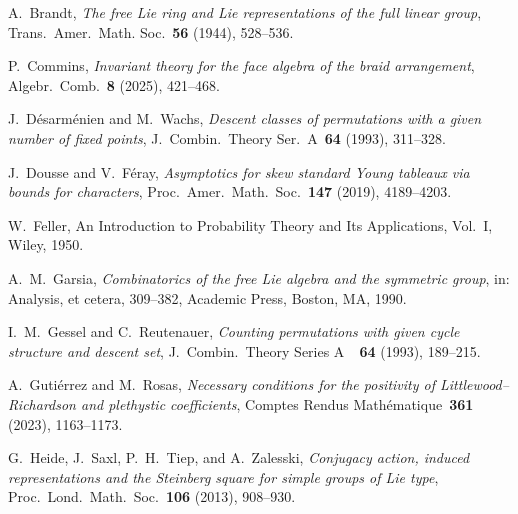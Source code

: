 \documentclass[12pt]%
{amsart}
\def\red#1{{\color{red}{#1}}}
\def\magenta#1{{\color{magenta}{#1}}}
\theoremstyle{plain}
\theoremstyle{definition}
\theoremstyle{remark}
\begin{document}
\begin{thebibliography}{}
    A.\ Brandt, 
    {\em The free Lie ring and Lie representations of the full linear group}, 
    Trans.\ Amer.\ Math. Soc.~{\bf 56} (1944), 528--536.


    P.\ Commins, 
    {\em Invariant theory for the face algebra of the braid arrangement}, 
    Algebr.\ Comb.~{\bf 8} (2025), 421--468.

    J.\ D\'esarm\'enien and M.\ Wachs, 
    {\em Descent classes of permutations with a given number of fixed points}, 
    J.\ Combin.\ Theory Ser.\ A~{\bf 64} (1993), 311--328.

    J.\ Dousse and V.\ F\'eray,
    {\em Asymptotics for skew standard Young tableaux via bounds for characters},
    Proc.\ Amer.\ Math.\ Soc.~{\bf 147} (2019), 4189--4203.

    W.\ Feller,
    An Introduction to Probability Theory and Its Applications, Vol.\ I,
    Wiley, 1950.



    A.\ M.\	Garsia, 
    {\em Combinatorics of the free Lie algebra and the symmetric group}, 
    in: Analysis, et cetera, 309--382, Academic Press, Boston, MA, 1990.

    I.\ M.\ Gessel and C.\ Reutenauer, 
    {\em Counting permutations with	given cycle structure and descent set}, 
    J.\ Combin.\ Theory Series A~{\bf~64} (1993), 189--215.

    A.\ Guti\'errez and M.\ Rosas,
    {\em Necessary conditions for the positivity of Littlewood–Richardson and plethystic coefficients},
    Comptes Rendus Math\'ematique~{\bf 361} (2023), 1163--1173.

    G.\ Heide, J.\ Saxl, P.\ H.\ Tiep, and A.\ Zalesski, 
    {\em Conjugacy action, induced representations and the Steinberg square for simple groups of Lie type}, 
    Proc.\ Lond.\ Math.\ Soc.~{\bf  106} (2013), 908--930.
        

\end{thebibliography}
\end{document}
